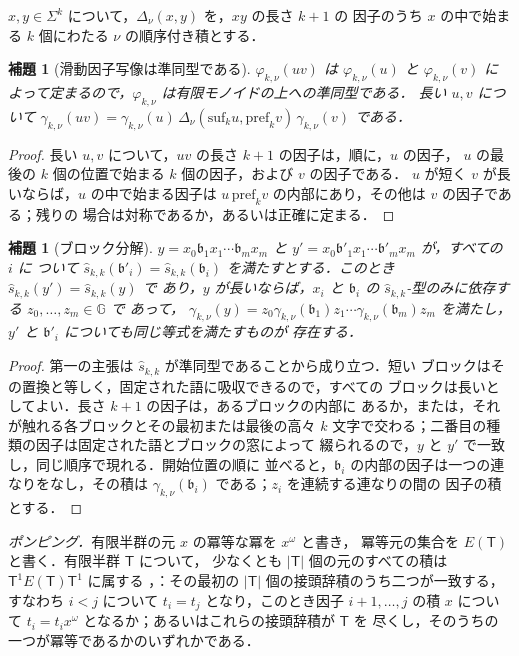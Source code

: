\documentclass[11pt,a4paper]{ltjsarticle}
\numberwithin{equation}{section}
\theoremstyle{plain}
\newtheorem{lemma}[theorem]{補題}
\theoremstyle{definition}
\theoremstyle{remark}
\theoremstyle{plain}
\begin{document}
$x,y\in\Sigma^k$ について，$\Delta_\nu(x,y)$ を，$xy$ の長さ $k+1$ の
因子のうち $x$ の中で始まる $k$ 個にわたる $\nu$ の順序付き積とする．

\begin{lemma}[滑動因子写像は準同型である]
\label{lem:sliding-morphism}
$\varphi_{k,\nu}(uv)$ は $\varphi_{k,\nu}(u)$ と $\varphi_{k,\nu}(v)$ に
よって定まるので，$\varphi_{k,\nu}$ は有限モノイドの上への準同型である．
長い $u,v$ について
$\gamma_{k,\nu}(uv)=\gamma_{k,\nu}(u)\,\Delta_\nu(\mathrm{suf}_ku,\mathrm{pref}_kv)\,\gamma_{k,\nu}(v)$
である．
\end{lemma}

\begin{proof}
長い $u,v$ について，$uv$ の長さ $k+1$ の因子は，順に，$u$ の因子，
$u$ の最後の $k$ 個の位置で始まる $k$ 個の因子，および $v$ の因子である．
$u$ が短く $v$ が長いならば，$u$ の中で始まる因子は
$u\,\mathrm{pref}_kv$ の内部にあり，その他は $v$ の因子である；残りの
場合は対称であるか，あるいは正確に定まる．
\end{proof}

\begin{lemma}[ブロック分解]
\label{lem:blocks}
$y=x_0\mathfrak b_1x_1\cdots\mathfrak b_mx_m$ と
$y'=x_0\mathfrak b'_1x_1\cdots\mathfrak b'_mx_m$ が，すべての $i$ に
ついて $\widehat s_{k,k}(\mathfrak b'_i)=\widehat s_{k,k}(\mathfrak b_i)$
を満たすとする．このとき $\widehat s_{k,k}(y')=\widehat s_{k,k}(y)$ で
あり，$y$ が長いならば，$x_i$ と $\mathfrak b_i$ の
$\widehat s_{k,k}$-型のみに依存する $z_0,\ldots,z_m\in\mathbb G$ で
あって，
$\gamma_{k,\nu}(y)=z_0\gamma_{k,\nu}(\mathfrak b_1)z_1\cdots\gamma_{k,\nu}(\mathfrak b_m)z_m$
を満たし，$y'$ と $\mathfrak b'_i$ についても同じ等式を満たすものが
存在する．
\end{lemma}

\begin{proof}
第一の主張は $\widehat s_{k,k}$ が準同型であることから成り立つ．短い
ブロックはその置換と等しく，固定された語に吸収できるので，すべての
ブロックは長いとしてよい．長さ $k+1$ の因子は，あるブロックの内部に
あるか，または，それが触れる各ブロックとその最初または最後の高々 $k$
文字で交わる；二番目の種類の因子は固定された語とブロックの窓によって
綴られるので，$y$ と $y'$ で一致し，同じ順序で現れる．開始位置の順に
並べると，$\mathfrak b_i$ の内部の因子は一つの連なりをなし，その積は
$\gamma_{k,\nu}(\mathfrak b_i)$ である；$z_i$ を連続する連なりの間の
因子の積とする．
\end{proof}

\emph{ポンピング．}有限半群の元 $x$ の冪等な冪を $x^\omega$ と書き，
冪等元の集合を $E(\mathsf T)$ と書く．有限半群 $\mathsf T$ について，
少なくとも $|\mathsf T|$ 個の元のすべての積は
$\mathsf T^1E(\mathsf T)\mathsf T^1$ に属する
\cite[補題~2.2]{AlmeidaEtAl2009}，\cite{Pin1986}：その最初の
$|\mathsf T|$ 個の接頭辞積のうち二つが一致する，すなわち $i<j$ について
$t_i=t_j$ となり，このとき因子 $i+1,\ldots,j$ の積 $x$ について
$t_i=t_ix^\omega$ となるか；あるいはこれらの接頭辞積が $\mathsf T$ を
尽くし，そのうちの一つが冪等であるかのいずれかである．
\end{document}
